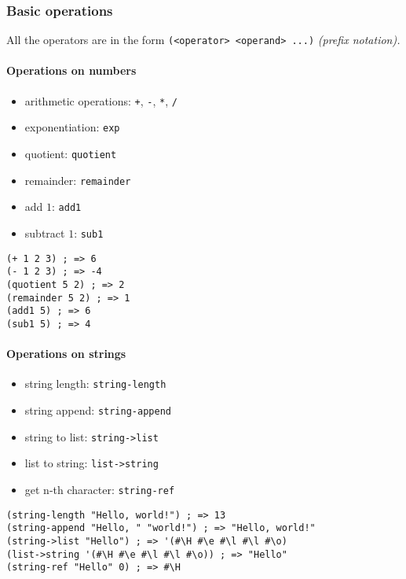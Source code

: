 \documentclass[a4paper,landscape,10pt]{article}
\begin{document}
\begin{multicols*}{2}
  \switchcolumn

  \subsubsection{Basic operations}

  All the operators are in the form \texttt{(<operator> <operand> ...)} \textit{(prefix notation).}

  \paragraph{Operations on numbers}

  \begin{itemize}
    \item arithmetic operations: \texttt{+}, \texttt{-}, \texttt{*}, \texttt{/}
    \item exponentiation: \texttt{exp}
    \item quotient: \texttt{quotient}
    \item remainder: \texttt{remainder}
    \item add \(1\): \texttt{add1}
    \item subtract \(1\): \texttt{sub1}
  \end{itemize}

  \begin{lstlisting}[language=Racket]
(+ 1 2 3) ; => 6
(- 1 2 3) ; => -4
(quotient 5 2) ; => 2
(remainder 5 2) ; => 1
(add1 5) ; => 6
(sub1 5) ; => 4
\end{lstlisting}

  \paragraph{Operations on strings}

  \begin{itemize}
    \item string length: \texttt{string-length}
    \item string append: \texttt{string-append}
    \item string to list: \texttt{string->list}
    \item list to string: \texttt{list->string}
    \item get n-th character: \texttt{string-ref}
  \end{itemize}

  \begin{lstlisting}[language=Racket]
(string-length "Hello, world!") ; => 13
(string-append "Hello, " "world!") ; => "Hello, world!"
(string->list "Hello") ; => '(#\H #\e #\l #\l #\o)
(list->string '(#\H #\e #\l #\l #\o)) ; => "Hello"
(string-ref "Hello" 0) ; => #\H
\end{lstlisting}


\end{multicols*}
\end{document}
